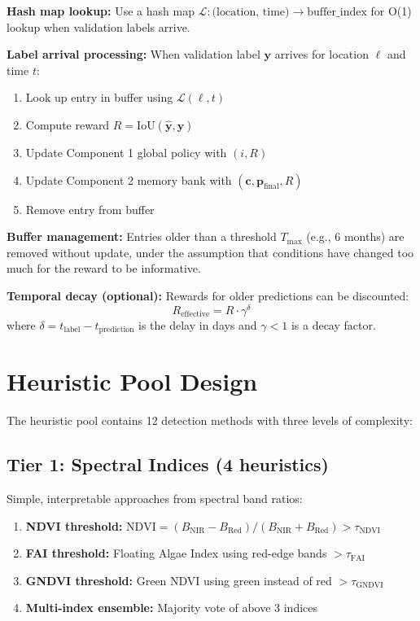 \documentclass[12pt,oneside]{book}
\begin{document}
\textbf{Hash map lookup:} Use a hash map $\mathcal{L}: \text{(location, time)} \rightarrow \text{buffer\_index}$ for O(1) lookup when validation labels arrive.

\textbf{Label arrival processing:} When validation label $\mathbf{y}$ arrives for location $\ell$ and time $t$:
\begin{enumerate}
    \item Look up entry in buffer using $\mathcal{L}(\ell, t)$
    \item Compute reward $R = \text{IoU}(\hat{\mathbf{y}}, \mathbf{y})$
    \item Update Component 1 global policy with $(i, R)$
    \item Update Component 2 memory bank with $(\mathbf{c}, \mathbf{p}_\text{final}, R)$
    \item Remove entry from buffer
\end{enumerate}

\textbf{Buffer management:} Entries older than a threshold $T_\text{max}$ (e.g., 6 months) are removed without update, under the assumption that conditions have changed too much for the reward to be informative.

\textbf{Temporal decay (optional):} Rewards for older predictions can be discounted:
\begin{equation}
    R_\text{effective} = R \cdot \gamma^{\delta}
\end{equation}
where $\delta = t_\text{label} - t_\text{prediction}$ is the delay in days and $\gamma < 1$ is a decay factor.

\section{Heuristic Pool Design}
\label{sec:heuristic-pool}

The heuristic pool contains 12 detection methods with three levels of complexity:

\subsection{Tier 1: Spectral Indices (4 heuristics)}

Simple, interpretable approaches from spectral band ratios:
\begin{enumerate}
    \item \textbf{NDVI threshold:} $\text{NDVI} = (B_\text{NIR} - B_\text{Red}) / (B_\text{NIR} + B_\text{Red}) > \tau_\text{NDVI}$
    \item \textbf{FAI threshold:} Floating Algae Index using red-edge bands $> \tau_\text{FAI}$
    \item \textbf{GNDVI threshold:} Green NDVI using green instead of red $> \tau_\text{GNDVI}$
    \item \textbf{Multi-index ensemble:} Majority vote of above 3 indices
\end{enumerate}
\end{document}
